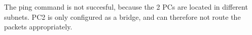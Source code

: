 The ping command is not succesful, because the 2 PCs are located in different subnets. PC2 is only configured as a bridge, and can therefore not route the packets appropriately.
